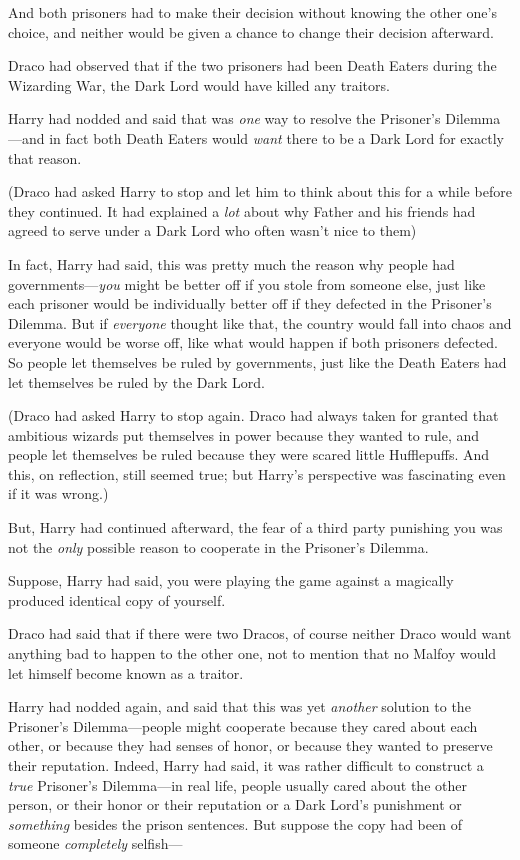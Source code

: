 And both prisoners had to make their decision without knowing the other one's
choice, and neither would be given a chance to change their decision afterward.

Draco had observed that if the two prisoners had been Death Eaters during the
Wizarding War, the Dark Lord would have killed any traitors.

Harry had nodded and said that was \emph{one} way to resolve the Prisoner's
Dilemma---and in fact both Death Eaters would \emph{want} there to be a Dark
Lord for exactly that reason.

(Draco had asked Harry to stop and let him to think about this for a while
before they continued. It had explained a \emph{lot} about why Father and his
friends had agreed to serve under a Dark Lord who often wasn't nice to
them{\el})

In fact, Harry had said, this was pretty much the reason why people had
governments---\emph{you} might be better off if you stole from someone else,
just like each prisoner would be individually better off if they defected in
the Prisoner's Dilemma. But if \emph{everyone} thought like that, the country
would fall into chaos and everyone would be worse off, like what would happen
if both prisoners defected. So people let themselves be ruled by governments,
just like the Death Eaters had let themselves be ruled by the Dark Lord.

(Draco had asked Harry to stop again. Draco had always taken for granted that
ambitious wizards put themselves in power because they wanted to rule, and
people let themselves be ruled because they were scared little Hufflepuffs. And
this, on reflection, still seemed true; but Harry's perspective was fascinating
even if it was wrong.)

But, Harry had continued afterward, the fear of a third party punishing you was
not the \emph{only} possible reason to cooperate in the Prisoner's Dilemma.

Suppose, Harry had said, you were playing the game against a magically produced
identical copy of yourself.

Draco had said that if there were two Dracos, of course neither Draco would
want anything bad to happen to the other one, not to mention that no Malfoy
would let himself become known as a traitor.

Harry had nodded again, and said that this was yet \emph{another} solution to
the Prisoner's Dilemma---people might cooperate because they cared about each
other, or because they had senses of honor, or because they wanted to preserve
their reputation. Indeed, Harry had said, it was rather difficult to construct
a \emph{true} Prisoner's Dilemma---in real life, people usually cared about the
other person, or their honor or their reputation or a Dark Lord's punishment or
\emph{something} besides the prison sentences. But suppose the copy had been of
someone \emph{completely} selfish---

